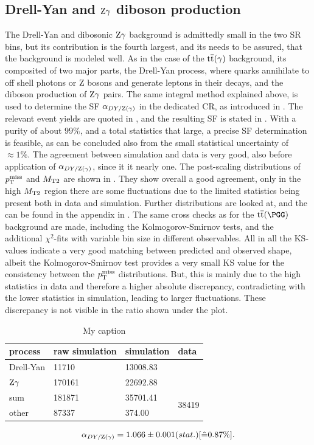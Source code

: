 \subsection{Drell-Yan and $\mathrm{Z}\gamma$ diboson production}
The Drell-Yan and dibosonic $\mathrm{Z}\gamma$ background is admittedly small in the two SR bins, but its contribution is the fourth largest, and its needs to be assured, that the background is modeled well. As in the case of the ${\mathrm{t}\overline{\mathrm{t}}}(\gamma)$ background, its composited of two major parts, the Drell-Yan process, where quarks annihilate to off shell photons or Z bosons and generate leptons in their decays, and the diboson production of $\mathrm{Z}\gamma$ pairs. The same integral method explained above, is used to determine the SF $\alpha_{DY/\mathrm{Z}(\gamma)}$ in the dedicated CR, as introduced in . The relevant event yields are quoted in , and the resulting SF is stated in . With a purity of about $99\%$, and a total statistics that large, a precise SF determination is feasible, as can be concluded also from the small statistical uncertainty of $\approx1\%$. The agreement between simulation and data is very good, also before application of $\alpha_{DY/\mathrm{Z}(\gamma)}$, since it it nearly one. The post-scaling distributions of $p_{\mathrm{T}}^\text{miss}$ and $M_{\mathrm{T2}}$ are shown in . They show overall a good agreement, only in the high $M_{\mathrm{T2}}$ region there are some fluctuations due to the limited statistics being present both in data and simulation. Further distributions are looked at, and the can be found in the appendix in . The same cross checks as for the $\ttbar(\PGG)$ background are made, including the Kolmogorov-Smirnov tests, and the additional $\chi^2$-fits with variable bin size in different observables.
All in all the KS-values indicate a very good matching between predicted and observed shape, albeit the Kolmogorov-Smirnov test provides a very small KS value for the consistency between the $p_{\mathrm{T}}^\text{miss}$ distributions. But, this is mainly due to the high statistics in data and therefore a higher absolute discrepancy, contradicting with the lower statistics in simulation, leading to larger fluctuations. These discrepancy is not visible in the ratio shown under the plot.\\
\begin{table}[tbp]
 \centering
 \caption{My caption}
 \label{tab:CRDY}
 \begin{tabular}{llll}
  
  process   & raw simulation & simulation & data                   \\\hline
  Drell-Yan & 11710          & 13008.83   &                        \\
  $\mathrm{Z}\gamma$ & 170161         & 22692.88   &                        \\\hline\hline
  sum       & 181871         & 35701.41   & \multirow{2}{*}{38419} \\
  other     & 87337          & 374.00     &                        
 \end{tabular}
\end{table}
\begin{equation}\label{eq:AlphaDY}
 \alpha_{DY/\mathrm{Z}(\gamma)}=1.066 \pm 0.001 (stat.) [\hat{=}0.87\%].
\end{equation}

